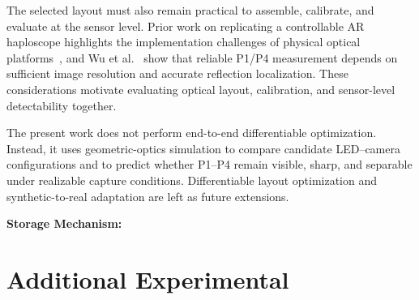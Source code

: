 \documentclass[sigconf,screen,review]{acmart}
\begin{document}
The selected layout must also remain practical to assemble, calibrate, and evaluate at the sensor level. Prior work on replicating a controllable AR haploscope highlights the implementation challenges of physical optical platforms~\cite{AR_Haploscope_Replication}, and Wu et al.~ show that reliable P1/P4 measurement depends on sufficient image resolution and accurate reflection localization. These considerations motivate evaluating optical layout, calibration, and sensor-level detectability together.

The present work does not perform end-to-end differentiable optimization. Instead, it uses geometric-optics simulation to compare candidate LED--camera configurations and to predict whether P1--P4 remain visible, sharp, and separable under realizable capture conditions. Differentiable layout optimization and synthetic-to-real adaptation are left as future extensions.

\textbf{Storage Mechanism:}

\section{Additional Experimental}
\nocite{*}


\end{document}

